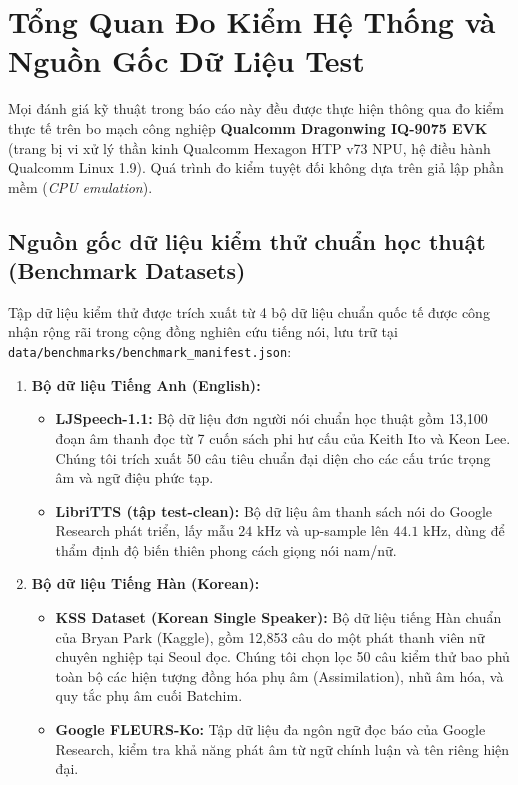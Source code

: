 \documentclass[11pt,a4paper,oneside,table]{report}
\begin{document}
\section{Tổng Quan Đo Kiểm Hệ Thống và Nguồn Gốc Dữ Liệu Test}
Mọi đánh giá kỹ thuật trong báo cáo này đều được thực hiện thông qua đo kiểm thực tế trên bo mạch công nghiệp \textbf{Qualcomm Dragonwing IQ-9075 EVK} (trang bị vi xử lý thần kinh Qualcomm Hexagon HTP v73 NPU, hệ điều hành Qualcomm Linux 1.9). Quá trình đo kiểm tuyệt đối không dựa trên giả lập phần mềm (\textit{CPU emulation}).

\subsection{Nguồn gốc dữ liệu kiểm thử chuẩn học thuật (Benchmark Datasets)}
Tập dữ liệu kiểm thử được trích xuất từ 4 bộ dữ liệu chuẩn quốc tế được công nhận rộng rãi trong cộng đồng nghiên cứu tiếng nói, lưu trữ tại \texttt{data/benchmarks/benchmark\_manifest.json}:
\begin{enumerate}
    \item \textbf{Bộ dữ liệu Tiếng Anh (English):}
    \begin{itemize}
        \item \textbf{LJSpeech-1.1:} Bộ dữ liệu đơn người nói chuẩn học thuật gồm 13,100 đoạn âm thanh đọc từ 7 cuốn sách phi hư cấu của Keith Ito và Keon Lee. Chúng tôi trích xuất 50 câu tiêu chuẩn đại diện cho các cấu trúc trọng âm và ngữ điệu phức tạp.
        \item \textbf{LibriTTS (tập test-clean):} Bộ dữ liệu âm thanh sách nói do Google Research phát triển, lấy mẫu $24\text{ kHz}$ và up-sample lên $44.1\text{ kHz}$, dùng để thẩm định độ biến thiên phong cách giọng nói nam/nữ.
    \end{itemize}
    \item \textbf{Bộ dữ liệu Tiếng Hàn (Korean):}
    \begin{itemize}
        \item \textbf{KSS Dataset (Korean Single Speaker):} Bộ dữ liệu tiếng Hàn chuẩn của Bryan Park (Kaggle), gồm 12,853 câu do một phát thanh viên nữ chuyên nghiệp tại Seoul đọc. Chúng tôi chọn lọc 50 câu kiểm thử bao phủ toàn bộ các hiện tượng đồng hóa phụ âm (Assimilation), nhũ âm hóa, và quy tắc phụ âm cuối Batchim.
        \item \textbf{Google FLEURS-Ko:} Tập dữ liệu đa ngôn ngữ đọc báo của Google Research, kiểm tra khả năng phát âm từ ngữ chính luận và tên riêng hiện đại.
    \end{itemize}
\end{enumerate}
\end{document}
